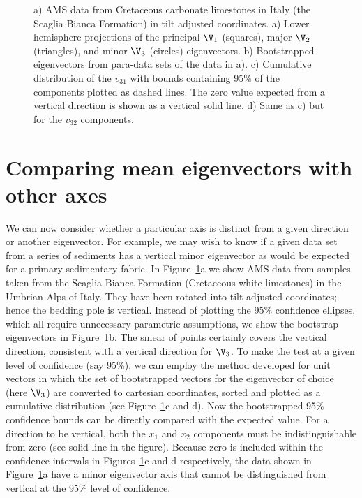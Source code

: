 \begin{figure}[h!tb]
\epsfxsize 15cm
\centering {}
\caption{a) AMS data from Cretaceous carbonate limestones in Italy (the
Scaglia Bianca Formation) in tilt adjusted coordinates. a) Lower
hemisphere projections of the principal $\V_1$ (squares), major 
$\V_2$ (triangles), and minor $\V_3$ (circles) eigenvectors.  
b) Bootstrapped eigenvectors
from para-data sets of the data in a).  c) Cumulative distribution of the $v_{31}$ with bounds containing 95\% of the components plotted as dashed lines.
The zero value expected from a vertical direction is shown as a 
vertical solid line.  d) Same as c) but for the $v_{32}$ components. }
\label{fig:kmin}
\end{figure}


\section{Comparing mean eigenvectors with other axes}

We can now  consider whether a particular axis is distinct from
a given direction or another eigenvector.  For example, we may wish to know
if a given data set from a series of sediments has a vertical minor 
eigenvector as would be expected for a primary sedimentary fabric.  
In Figure~\ref{fig:kmin}a we show AMS data from samples taken 
from the Scaglia Bianca Formation (Cretaceous white limestones)
in the Umbrian Alps of Italy.  They have been rotated into  tilt adjusted 
coordinates; hence the bedding pole is vertical.
Instead of plotting the 95\% confidence ellipses, which all require
 unnecessary parametric assumptions, we show the bootstrap eigenvectors in 
Figure~\ref{fig:kmin}b.  The smear of points certainly covers the vertical
direction,  consistent with a  vertical direction for $\V_3$.  To
make the test at a given level of confidence (say 95\%), we can employ the
method developed for unit vectors in which the set of bootstrapped vectors for the eigenvector of
choice (here $\V_3$) are converted to cartesian coordinates,  sorted and plotted as a cumulative distribution (see  Figure~\ref{fig:kmin}c and d).
%
Now the bootstrapped
 95\% confidence bounds can be directly compared with the expected
value.  For a direction to be vertical, both the $x_1$ and $x_2$ components
must be indistinguishable from zero (see solid line in the figure).  Because zero is included within
the confidence intervals in Figures~\ref{fig:kmin}c and d respectively, the  data  shown in Figure~\ref{fig:kmin}a have a minor eigenvector axis  that cannot be distinguished from vertical 
 at the 95\% level of confidence.
 




